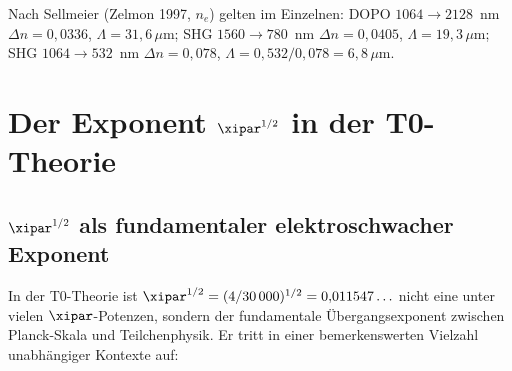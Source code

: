 \begin{table}[H]
    \centering
    \caption{Typische PPLN-Parameter für LiNbO$_3$ (außerordentliche
    Polarisation, Raumtemperatur, Sellmeier nach Zelmon 1997).}
    \label{tab:ppln}
\end{table}
Nach Sellmeier (Zelmon 1997, $n_e$) gelten im Einzelnen: DOPO $1064 \to 2128$~nm
$\Delta n = 0{,}0336$, $\Lambda = 31{,}6\,\mu$m; SHG $1560 \to 780$~nm $\Delta n = 0{,}0405$,
$\Lambda = 19{,}3\,\mu$m; SHG $1064 \to 532$~nm $\Delta n = 0{,}078$,
$\Lambda = 0{,}532/0{,}078 = 6{,}8\,\mu$m.

\clearpage

\section{%
  Der Exponent \texorpdfstring{$\xipar^{1/2}$}{xi\^{}(1/2)} in der T0-Theorie}
\label{sec:xi_halb}

\subsection{%
  \texorpdfstring{$\xipar^{1/2}$}{xi\^{}(1/2)} als fundamentaler
  elektroschwacher Exponent}

In der T0-Theorie ist $\xipar^{1/2} = (4/30\,000)^{1/2} = 0{,}011547\ldots$
nicht eine unter vielen $\xipar$-Potenzen, sondern der fundamentale
Übergangsexponent zwischen Planck-Skala und Teilchenphysik. Er tritt in
einer bemerkenswerten Vielzahl unabhängiger Kontexte auf:

